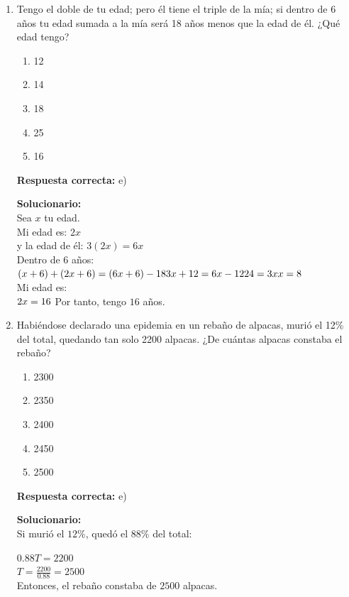 \begin{enumerate}
	\item Tengo el doble de tu edad; pero él tiene el triple de la mía; si dentro de 6 años tu edad sumada a la mía será 18 años menos que la edad de él. ¿Qué edad tengo?
	\begin{enumerate}[label=\alph*)]
		\item 12
		\item 14
		\item 18
		\item 25
		\item 16
	\end{enumerate}
	\textbf{Respuesta correcta:} e)
	
	\vspace{2mm}
	\textbf{Solucionario:}\\
	Sea \(x\) tu edad. \\
	Mi edad es: $2x$\\
	y la edad de él: $3(2x)=6x$\\
	Dentro de 6 años:\\
	$(x+6)+(2x+6)=(6x+6)-18\\
	3x+12=6x-12\\
	24=3x\\
	x=8$\\
	Mi edad es:\\
	$2x=16\\
	$
	Por tanto, tengo \(\boxed{16}\) años.
	
	\vspace{6mm}
	
	\item Habiéndose declarado una epidemia en un rebaño de alpacas, murió el 12\% del total, quedando tan solo 2200 alpacas. ¿De cuántas alpacas constaba el rebaño?
	\begin{enumerate}[label=\alph*)]
		\item 2300
		\item 2350
		\item 2400
		\item 2450
		\item 2500
	\end{enumerate}
	\textbf{Respuesta correcta:} e)
	
	\vspace{2mm}
	\textbf{Solucionario:}\\
	Si murió el \(12\%\), quedó el \(88\%\) del total:

	$0.88T = 2200$\\
	$T = \frac{2200}{0.88}=2500$\\
	Entonces, el rebaño constaba de \(\boxed{2500}\) alpacas.
	

\end{enumerate}
